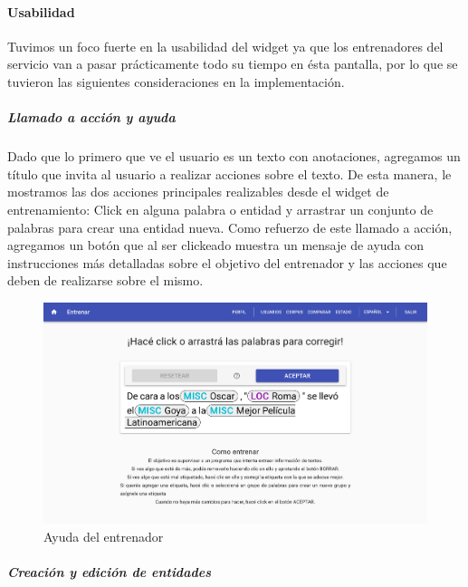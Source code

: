 \documentclass[12pt,a4paper,]{scrartcl}
\let\oldparagraph\paragraph
\renewcommand{\paragraph}[1]{\oldparagraph{#1}\mbox{}}
\let\oldsubparagraph\subparagraph
\renewcommand{\subparagraph}[1]{\oldsubparagraph{#1}\mbox{}}
\begin{document}
\hypertarget{usabilidad}{%
\paragraph{Usabilidad}\label{usabilidad}}

Tuvimos un foco fuerte en la usabilidad del widget ya que los entrenadores del servicio van a pasar prácticamente todo su tiempo en ésta pantalla, por lo que se tuvieron las siguientes consideraciones en la implementación.

\hypertarget{llamado-a-acciuxf3n-y-ayuda}{%
\subparagraph{Llamado a acción y ayuda}\label{llamado-a-acciuxf3n-y-ayuda}}

Dado que lo primero que ve el usuario es un texto con anotaciones, agregamos un título que invita al usuario a realizar acciones sobre el texto. De esta manera, le mostramos las dos acciones principales realizables desde el widget de entrenamiento: Click en alguna palabra o entidad y arrastrar un conjunto de palabras para crear una entidad nueva.
Como refuerzo de este llamado a acción, agregamos un botón que al ser clickeado muestra un mensaje de ayuda con instrucciones más detalladas sobre el objetivo del entrenador y las acciones que deben de realizarse sobre el mismo.

\begin{figure}[H]

{\centering \includegraphics{assets/logic/train-help.pdf} 

}

\caption{Ayuda del entrenador}\label{fig:logic-train-help}
\end{figure}

\hypertarget{creaciuxf3n-y-ediciuxf3n-de-entidades}{%
\subparagraph{Creación y edición de entidades}\label{creaciuxf3n-y-ediciuxf3n-de-entidades}}
\end{document}
